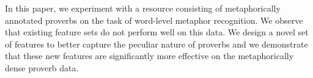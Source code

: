 In this paper, we experiment with a resource consisting of metaphorically annotated proverbs on the task of word-level metaphor recognition. We observe that existing feature sets do not perform well on this data. We design a novel set of features to better capture the peculiar nature of proverbs and we demonstrate that these new features are significantly more effective on the metaphorically dense proverb data.
